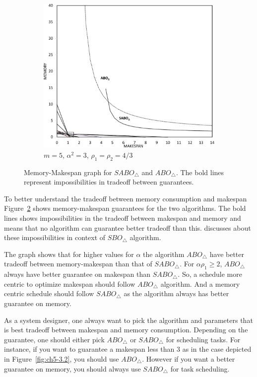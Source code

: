 \documentclass[twocolumn]{svjour3}
\begin{document}
\begin{figure}
  \begin{subfigure}[b]{0.5\textwidth}
    \includegraphics[width=\textwidth]{m5alpha3rho133.pdf}
    \caption{$m=5$, $\alpha^2=3$, $\rho_1=\rho_2=4/3$}
    \label{fig:ch5-3.3}
  \end{subfigure} %
  
  \caption{Memory-Makespan graph for $SABO_\triangle$ and
    $ABO_\triangle$. The bold lines represent impossibilities in
    tradeoff between guarantees.}
  \label{fig:ch5-3}
\end{figure}

To better understand the tradeoff between memory consumption and
makespan Figure~\ref{fig:ch5-3} shows memory-makespan guarantees for
the two algorithms.  The bold lines shows impossibilities in the
tradeoff between makespan and memory and means that no algorithm can
guarantee better tradeoff than this. \cite{SDM2008}
discusses about these impossibilities in context of $SBO_\triangle$
algorithm.
   
The graph shows that for higher values for $\alpha$ the algorithm
$ABO_\triangle$ have better tradeoff between memory-makespan than that
of $SABO_\triangle$. For $\alpha\rho_1\geq 2$, $ABO_\triangle$ always
have better guarantee on makespan than $SABO_\triangle$. So, a
schedule more centric to optimize makespan should follow
$ABO_\triangle$ algorithm. And a memory centric schedule should follow
$SABO_\triangle$ as the algorithm always has better guarantee on
memory.
   
As a system designer, one always want to pick the algorithm and
parameters that is best tradeoff between makespan and memory
consumption.  Depending on the guarantee, one should either pick
$ABO_\triangle$ or $SABO_\triangle$ for scheduling tasks.  For
instance, if you want to guarantee a makespan less than 3 as in the
case depicted in Figure~\ref{fig:ch5-3.2}, you should use
$ABO_\triangle$. However if you want a better guarantee on memory, you
should always use $SABO_\triangle$ for task scheduling.
     
\end{document}
